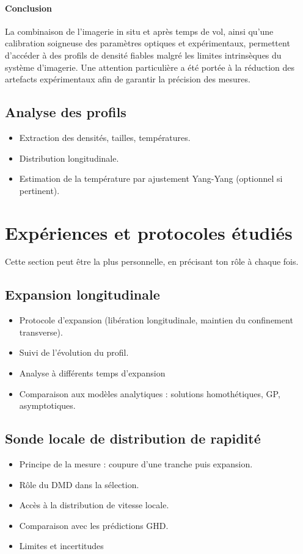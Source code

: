 \paragraph{Conclusion}

La combinaison de l’imagerie in situ et après temps de vol, ainsi qu’une calibration soigneuse des paramètres optiques et expérimentaux, permettent d’accéder à des profils de densité fiables malgré les limites intrinsèques du système d’imagerie. Une attention particulière a été portée à la réduction des artefacts expérimentaux afin de garantir la précision des mesures.


\subsection{Analyse des profils}

{\color{blue}
\begin{itemize}
    \item Extraction des densités, tailles, températures.
    \item Distribution longitudinale.
    \item Estimation de la température par ajustement Yang-Yang (optionnel si pertinent).
\end{itemize}
}


\section{Expériences et protocoles étudiés}
Cette section peut être la plus personnelle, en précisant ton rôle à chaque fois.
\subsection{Expansion longitudinale}
\begin{itemize}
    \item Protocole d’expansion (libération longitudinale, maintien du confinement transverse).
    \item Suivi de l’évolution du profil.
    \item Analyse à différents temps d’expansion
    \item Comparaison aux modèles analytiques : solutions homothétiques, GP, asymptotiques.
\end{itemize}

\subsection{Sonde locale de distribution de rapidité}
\begin{itemize}
    \item Principe de la mesure : coupure d’une tranche puis expansion.
    \item Rôle du DMD dans la sélection.
    \item Accès à la distribution de vitesse locale.
    \item Comparaison avec les prédictions GHD.
    \item Limites et incertitudes
\end{itemize}

